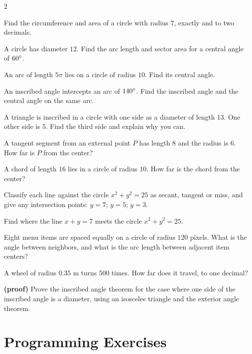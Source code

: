 \begin{multicols}{2}
\begin{exercises}
\item Find the circumference and area of a circle with radius $7$, exactly and to two decimals.
\item A circle has diameter $12$. Find the arc length and sector area for a central angle of $60^\circ$.
\item An arc of length $5\pi$ lies on a circle of radius $10$. Find its central angle.
\item An inscribed angle intercepts an arc of $140^\circ$. Find the inscribed angle and the central angle on the same arc.
\item A triangle is inscribed in a circle with one side as a diameter of length $13$. One other side is $5$. Find the third side and explain why you can.
\item A tangent segment from an external point $P$ has length $8$ and the radius is $6$. How far is $P$ from the center?
\item A chord of length $16$ lies in a circle of radius $10$. How far is the chord from the center?
\item Classify each line against the circle $x^2 + y^2 = 25$ as secant, tangent or miss, and give any intersection points: $y = 7$; $y = 5$; $y = 3$.
\item Find where the line $x + y = 7$ meets the circle $x^2 + y^2 = 25$.
\item Eight menu items are spaced equally on a circle of radius $120$ pixels. What is the angle between neighbors, and what is the arc length between adjacent item centers?
\item A wheel of radius $0.35$ m turns $500$ times. How far does it travel, to one decimal?
\item \textbf{(proof)} Prove the inscribed angle theorem for the case where one side of the inscribed angle is a diameter, using an isosceles triangle and the exterior angle theorem.
\end{exercises}
\end{multicols}

\section{Programming Exercises}

